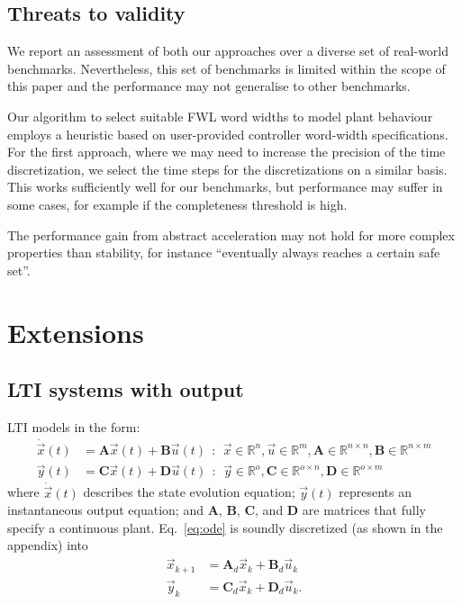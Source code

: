 \documentclass[runningheads,a4paper]{llncs}
\newcommand{\mat}[1]{\boldsymbol{#1}}
\begin{document}
\subsection{Threats to validity}
We report an assessment of both our approaches over a diverse set of real-world benchmarks. Nevertheless, this set of benchmarks is limited within the scope of this paper and the performance may not generalise to other benchmarks. 

Our algorithm to select suitable FWL word widths to model plant behaviour employs a heuristic based on user-provided controller word-width specifications. For the first approach, where we may need to increase the precision of the time discretization, we select the time steps for the discretizations on a similar basis. This works sufficiently well for our benchmarks, but performance may suffer in some cases, for example if the completeness threshold is high. 

The performance gain from abstract acceleration may not hold for more complex properties than stability, for instance ``eventually always reaches a certain safe set''. 




\section{Extensions}
\label{sec:extensions}

\subsection{LTI systems with output} 
\label{ssec:LTI}

LTI models in the form: 
%
\begin{align}
\dot{\vec{x}}(t)&=\mat{A}\vec{x}(t)+\mat{B}\vec{u}(t)\ \ :\ \ \vec{x} \in \mathbb{R}^{n}, \vec{u} \in \mathbb{R}^m, \mat{A} \in \mathbb{R}^{n \times n},\mat{B} \in \mathbb{R}^{n \times m}\\
\vec{y}(t)&=\mat{C}\vec{x}(t)+\mat{D}\vec{u}(t)\ \ :\ \ \vec{y} \in \mathbb{R}^{o}, \mat{C} \in \mathbb{R}^{o \times n}, \mat{D}  \in \mathbb{R}^{o \times m}\nonumber
\end{align}
\noindent where $\dot{\vec{x}}(t)$ describes the state evolution equation; 
$\vec{y}(t)$ represents an instantaneous output equation; and $\mat{A}$, $\mat{B}$, $\mat{C}$, and $\mat{D}$ are matrices that fully specify 
a continuous plant. Eq.~\eqref{eq:ode} is soundly discretized 
(as shown in the appendix) into
%
\begin{align}
\vec{x}_{k+1}&=\mat{A}_d\vec{x}_k+\mat{B}_d\vec{u}_k\\
\vec{y}_k&=\mat{C}_d\vec{x}_k+\mat{D}_d\vec{u}_k .\nonumber
\end{align}
%
\end{document}

